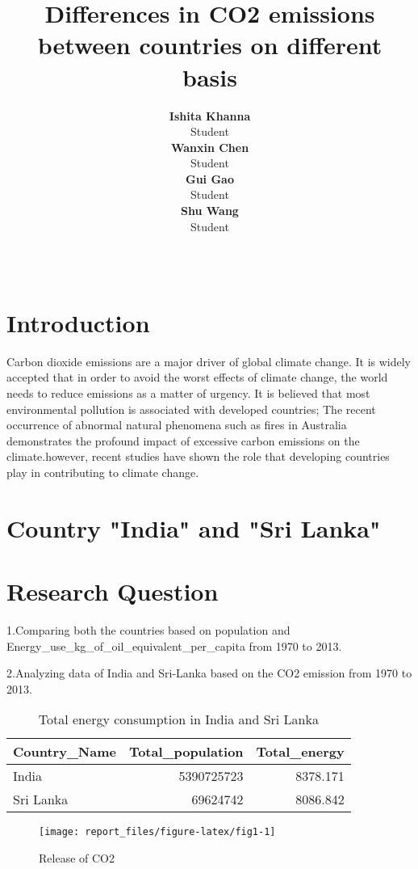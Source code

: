 \documentclass[11pt,a4paper,]{article}
\title{Differences in CO2 emissions between countries on different basis}
\author{\sf\Large\textbf{ Ishita Khanna}\\ {\sf\large Student\\[0.5cm]} \sf\Large\textbf{ Wanxin Chen}\\ {\sf\large Student\\[0.5cm]} \sf\Large\textbf{ Gui Gao}\\ {\sf\large Student\\[0.5cm]} \sf\Large\textbf{ Shu Wang}\\ {\sf\large Student\\[0.5cm]}}
\date{\sf\Date~\Month~\Year}
\makeatletter
\def\titlepage{\front{\expandafter{\@title}}{\@author}{\@organization}}
\makeatother
\begin{document}
\titlepage

\hypertarget{introduction}{%
\section{Introduction}\label{introduction}}

Carbon dioxide emissions are a major driver of global climate change. It is widely accepted that in order to avoid the worst effects of climate change, the world needs to reduce emissions as a matter of urgency. It is believed that most environmental pollution is associated with developed countries; The recent occurrence of abnormal natural phenomena such as fires in Australia demonstrates the profound impact of excessive carbon emissions on the climate.however, recent studies have shown the role that developing countries play in contributing to climate change.

\section*{Country "India" and "Sri Lanka"}

\hypertarget{research-question}{%
\section{Research Question}\label{research-question}}

1.Comparing both the countries based on population and Energy\_use\_kg\_of\_oil\_equivalent\_per\_capita from 1970 to 2013.

2.Analyzing data of India and Sri-Lanka based on the CO2 emission from 1970 to 2013.

\begin{table}[!h]

\caption{\label{tab:EnergyComparison}Total energy consumption in India and Sri Lanka}
\centering
\begin{tabular}[t]{lrr}
\toprule
Country\_Name & Total\_population & Total\_energy\\
\midrule
India & 5390725723 & 8378.171\\
Sri Lanka & 69624742 & 8086.842\\
\bottomrule
\end{tabular}
\end{table}

\begin{figure}[H]

{\centering \texttt{[image: report\_files/figure-latex/fig1-1]} 

}

\caption{Release of CO2}\label{fig:fig1}
\end{figure}
\end{document}
